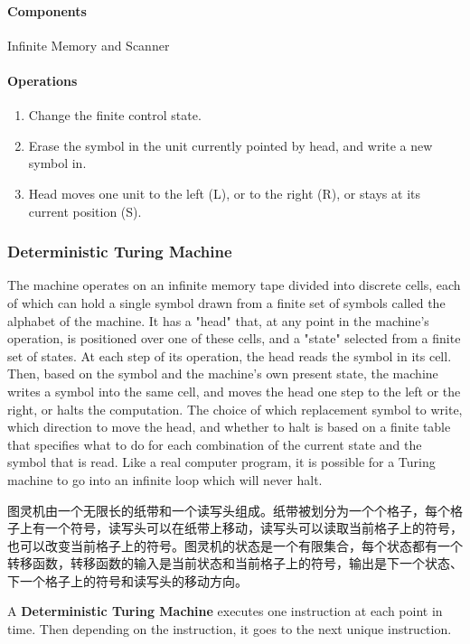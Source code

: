 \documentclass{article}
\begin{document}
\paragraph{Components} Infinite Memory and Scanner

\paragraph{Operations} 
\begin{enumerate}
    \item Change the finite control state.
    \item Erase the symbol in the unit currently pointed by head, and write a new symbol in.
    \item Head moves one unit to the left (L), or to the right (R), or stays at its current position (S).
\end{enumerate}

\subsubsection{Deterministic Turing Machine}
The machine operates on an infinite memory tape divided into discrete cells, each of which can hold a single symbol drawn from a finite set of symbols called the alphabet of the machine. It has a "head" that, at any point in the machine's operation, is positioned over one of these cells, and a "state" selected from a finite set of states. At each step of its operation, the head reads the symbol in its cell. Then, based on the symbol and the machine's own present state, the machine writes a symbol into the same cell, and moves the head one step to the left or the right, or halts the computation. The choice of which replacement symbol to write, which direction to move the head, and whether to halt is based on a finite table that specifies what to do for each combination of the current state and the symbol that is read. Like a real computer program, it is possible for a Turing machine to go into an infinite loop which will never halt.\par
图灵机由一个无限长的纸带和一个读写头组成。纸带被划分为一个个格子，每个格子上有一个符号，读写头可以在纸带上移动，读写头可以读取当前格子上的符号，也可以改变当前格子上的符号。图灵机的状态是一个有限集合，每个状态都有一个转移函数，转移函数的输入是当前状态和当前格子上的符号，输出是下一个状态、下一个格子上的符号和读写头的移动方向。\par
A \textbf{Deterministic Turing Machine} executes one instruction at each point in time.  Then depending on the instruction, it goes to the next unique instruction.
\end{document}
